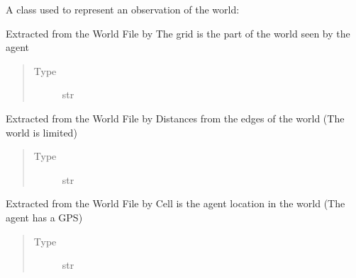 \documentclass[letterpaper,10pt,english]{sphinxmanual}
\begin{document}
\begin{fulllineitems}
\label{\detokenize{index:mission.observation}}
A class used to represent an observation of the world:

\begin{fulllineitems}
\label{\detokenize{index:mission.observation.set_grid}}
Extracted from the  World File by 
The grid is the part of the world seen by the agent
\begin{quote}\begin{description}
\item[{Type}] \leavevmode
str

\end{description}\end{quote}

\end{fulllineitems}


\begin{fulllineitems}
\label{\detokenize{index:mission.observation.set_edge_distances}}
Extracted from the  World File by 
Distances from the edges of the world (The world is limited)
\begin{quote}\begin{description}
\item[{Type}] \leavevmode
str

\end{description}\end{quote}

\end{fulllineitems}


\begin{fulllineitems}
\label{\detokenize{index:mission.observation.set_cell}}
Extracted from the  World File by 
Cell is the agent location in the world (The agent has a GPS)
\begin{quote}\begin{description}
\item[{Type}] \leavevmode
str


\end{description}
\end{quote}
\end{fulllineitems}
\end{fulllineitems}
\end{document}
